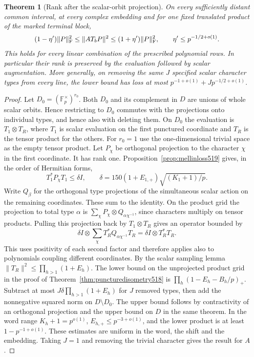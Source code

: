 \documentclass[a4paper,11pt]{article}
\newtheorem{theorem}[proposition]{Theorem}
\theoremstyle{definition}
\theoremstyle{remark}
\numberwithin{equation}{section}
\begin{document}
\begin{theorem}[Rank after the scalar-orbit projection]\leavevmode
\label{thm:scalaraugmentation519}
On every sufficiently distant common interval, at every complex
embedding and for one fixed translated product of the marked
terminal block,
\[
 (1-\eta')\|P\|_{\rm F}^2\le\|A T_bP\|^2
              \le(1+\eta')\|P\|_{\rm F}^2,
        \qquad \eta'\le p^{-1/2+o(1)} .
\]
This holds for every linear combination of the prescribed
polynomial rows. In particular their rank is preserved by
the evaluation followed by scalar augmentation. More generally,
on removing the same \(J\) specified scalar character types from
every line, the lower bound has loss at most
\(p^{-1+o(1)}+Jp^{-1/2+o(1)}\).
\end{theorem}
\begin{proof}
Let \(D_0=(\mathbb F_p^\times)^{r_0}\). Both \(D_0\) and its
complement in \(D\) are unions of whole scalar orbits. Hence
restricting to \(D_0\) commutes with the projections onto
individual types, and hence also with deleting them. On \(D_0\)
the evaluation is \(T_1\otimes T_R\), where \(T_1\) is scalar
evaluation on the first punctured coordinate and \(T_R\) is the
tensor product for the others. For \(r_0=1\) use the one-dimensional
trivial space as the empty tensor product. Let \(P_\chi\) be
orthogonal projection to the character \(\chi\) in the first
coordinate. It has rank one. Proposition~\ref{prop:mellinloss519}
gives, in the order of Hermitian forms,
\[
  T_1^*P_\chi T_1\le \delta I,\qquad
        \delta=150(1+E_{1,+})\sqrt{(K_1+1)/p}.
\]
Write \(Q_\beta\) for the orthogonal type projections of the
simultaneous scalar action on the remaining coordinates. These
sum to the identity. On the product grid the projection to
total type \(\alpha\) is \(\sum_\chi P_\chi\otimes
Q_{\alpha\chi^{-1}}\), since characters multiply on tensor products.
Pulling this projection back by \(T_1\otimes T_R\) gives an
operator bounded by
\[
  \delta I\otimes\sum_\chi T_R^* Q_{\alpha\chi^{-1}}T_R
         =\delta I\otimes T_R^*T_R .
\]
This uses positivity of each second factor and therefore applies
also to polynomials coupling different coordinates. By the scalar
sampling lemma \(\|T_R\|^2\le\prod_{h>1}(1+E_h)\). The lower
bound on the unprojected product grid in the proof of
Theorem~\ref{thm:puncturedisometry518} is
\(\prod_h(1-E_h-B_h/p)_+\). Subtract at most
\(J\delta\prod_{h>1}(1+E_h)\) for \(J\) removed types, then add
the nonnegative squared norm on \(D\setminus D_0\). The upper
bound follows by contractivity of an orthogonal projection and
the upper bound on \(D\) in the same theorem. In the word range
\(K_h+1=p^{o(1)}\), \(E_{h,+}\le p^{-3+o(1)}\), and the lower
product is at least \(1-p^{-1+o(1)}\). These estimates are uniform
in the word, the shift and the embedding. Taking \(J=1\) and
removing the trivial character gives the result for \(A\).
\end{proof}
\end{document}
